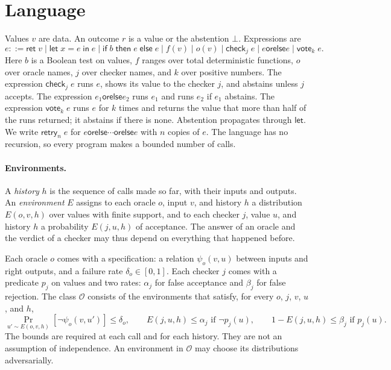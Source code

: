 \documentclass[acmsmall,nonacm,screen]{acmart}
\newcommand{\kw}[1]{\mathsf{#1}}
\newcommand{\ret}{\kw{ret}}
\newcommand{\letin}[3]{\kw{let}\;#1 = #2\;\kw{in}\;#3}
\newcommand{\ite}[3]{\kw{if}\;#1\;\kw{then}\;#2\;\kw{else}\;#3}
\newcommand{\chk}[2]{\kw{check}_{#1}\;#2}
\newcommand{\vote}[2]{\kw{vote}_{#1}\;#2}
\newcommand{\orelse}{\mathbin{\kw{orelse}}}
\newcommand{\retry}[2]{\kw{retry}_{#1}\;#2}
\newcommand{\cO}{\mathcal{O}}
\begin{document}
\section{Language}
\label{sec:lang}

Values $v$ are data. An outcome $r$ is a value or the abstention $\bot$. Expressions are
\[
e ::= \ret\;v \mid \letin{x}{e}{e} \mid \ite{b}{e}{e} \mid f(v) \mid o(v) \mid \chk{j}{e}
  \mid e \orelse e \mid \vote{k}{e} .
\]
Here $b$ is a Boolean test on values, $f$ ranges over total deterministic functions, $o$ over
oracle names, $j$ over checker names, and $k$ over positive numbers. The expression
$\chk{j}{e}$ runs $e$, shows its value to the checker $j$, and abstains unless $j$ accepts.
The expression $e_1 \orelse e_2$ runs $e_1$ and runs $e_2$ if $e_1$ abstains. The expression
$\vote{k}{e}$ runs $e$ for $k$ times and returns the value that more than half of the runs
returned; it abstains if there is none. Abstention propagates through $\kw{let}$. We write
$\retry{n}{e}$ for $e \orelse \cdots \orelse e$ with $n$ copies of $e$. The language has no
recursion, so every program makes a bounded number of calls.

\paragraph{Environments.}
A \emph{history} $h$ is the sequence of calls made so far, with their inputs and outputs. An
\emph{environment} $E$ assigns to each oracle $o$, input $v$, and history $h$ a distribution
$E(o, v, h)$ over values with finite support, and to each checker $j$, value $u$, and history
$h$ a probability $E(j, u, h)$ of acceptance. The answer of an oracle and the verdict of a
checker may thus depend on everything that happened before.

Each oracle $o$ comes with a specification: a relation $\psi_o(v, u)$ between inputs and right
outputs, and a failure rate $\delta_o \in [0, 1]$. Each checker $j$ comes with a predicate
$p_j$ on values and two rates: $\alpha_j$ for false acceptance and $\beta_j$ for false
rejection. The class $\cO$ consists of the environments that satisfy, for every $o$, $j$, $v$,
$u$, and $h$,
\[
\Pr_{u' \sim E(o, v, h)}[\neg \psi_o(v, u')] \le \delta_o, \qquad
E(j, u, h) \le \alpha_j \text{ if } \neg p_j(u), \qquad
1 - E(j, u, h) \le \beta_j \text{ if } p_j(u) .
\]
The bounds are required at each call and for each history. They are not an assumption of
independence. An environment in $\cO$ may choose its distributions adversarially.
\end{document}

